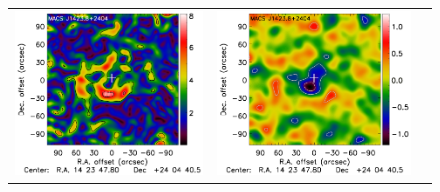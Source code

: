 \documentclass[twocolumn,traditabstract]{aa}
\begin{document}
\begin{figure}[p]
{\begin{tabular}{lll}
\includegraphics[trim=2.3cm 2.2cm 0cm 0cm, clip=true, scale=1]{Figure/Grad_MACSJ1424_15_15_45.pdf} & 
\includegraphics[trim=2.3cm 2.2cm 0cm 0cm, clip=true, scale=1]{Figure/DoG_MACSJ1424_15_15_45.pdf} \\

\end{tabular}}
\end{figure}
\end{document}
